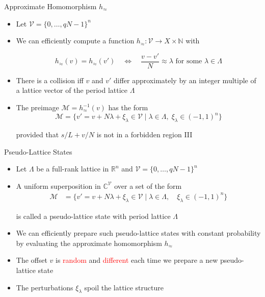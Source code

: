 \documentclass{beamer}
\newcommand{\R}{\mathbb{R}}
\renewcommand{\>}{\rangle}
\newcommand{\<}{\langle}
\begin{document}
\begin{frame}{Approximate Homomorphism $h_\approx$}

\begin{itemize}
\item Let $\mathcal{V}=\{0,\ldots,qN-1\}^n$ 

\medskip
\item We can efficiently compute a function $h_\approx : \mathcal{V} \rightarrow X\times\mathbb{N}$ with

\[
	h_\approx(v)=h_\approx(v') \quad\Longleftrightarrow\quad \frac{v-v'}{N} \approx \lambda \mbox{ for some $\lambda\in\Lambda$}
\]

\medskip
\item There is a collision iff $v$ and $v'$ differ approximately by an integer multiple of a lattice vector of the period lattice $\Lambda$

\medskip
\item The preimage $\mathcal{M}=h_{\approx}^{-1}(v)$ has the form
\[
	\mathcal{M} = \{ 
	v' = v + N \lambda + \xi_\lambda \in\mathcal{V} \mid \lambda\in\Lambda,\; \xi_\lambda\in(-1,1)^n
	\}
\]

provided that $s/L+v/N$ is not in a forbidden region III
\end{itemize}

\end{frame}



\begin{frame}{Pseudo-Lattice States}

\begin{itemize}
\item Let $\Lambda$ be a full-rank lattice in $\R^n$
and $\mathcal{V}=\{0,\ldots,qN-1\}^n$

\medskip
\item A uniform superposition in $\mathbb{C}^\mathcal{V}$ over a set of the form
\begin{align*}
\mathcal{M}  & = \{ 
v' = v + N \lambda + \xi_\lambda\in\mathcal{V} \mid \lambda\in\Lambda,\quad \xi_\lambda\in(-1,1)^n  
\}
\end{align*}

is called a pseudo-lattice state with period lattice $\Lambda$

\bigskip
\item We can efficiently prepare such pseudo-lattice states with constant probability by evaluating the approximate homomorphism $h_\approx$ 

\medskip
\item The offset $v$ is \textcolor{red}{random} and \textcolor{red}{different} each time we prepare a new pseudo-lattice state 

\medskip
\item The perturbations $\xi_\lambda$ spoil the lattice structure
 
\end{itemize}
\end{frame}
\end{document}
